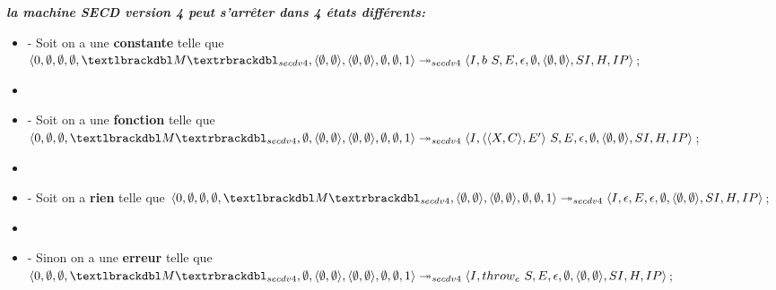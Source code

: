 \documentclass[10pt,a4paper]{report}
\begin{document}
	
	\textbf{\textit{la machine SECD version 4 peut s'arrêter dans 4 états différents:}}
	\smallbreak
	\begin{itemize}
		\item[] - Soit on a une \textbf{constante} telle que $\langle 0,\emptyset,\emptyset,\emptyset,\textlbrackdbl M\textrbrackdbl_{secdv4},\langle\emptyset,\emptyset\rangle,\langle\emptyset,\emptyset\rangle,\emptyset,\emptyset,1\rangle \\
		\twoheadrightarrow_{secdv4} \langle I,b~S,E,\epsilon,\emptyset,\langle\emptyset,\emptyset\rangle,SI,H,IP\rangle$;
		\item[] 
		\item[] - Soit on a une \textbf{fonction} telle que
		$\langle 0,\emptyset,\emptyset,\textlbrackdbl M\textrbrackdbl_{secdv4},\emptyset,\langle\emptyset,\emptyset\rangle,\langle\emptyset,\emptyset\rangle,\emptyset,\emptyset,1\rangle \\
		\twoheadrightarrow_{secdv4} \langle I,\langle\langle X,C\rangle,E'\rangle~S,E,\epsilon,\emptyset,\langle\emptyset,\emptyset\rangle,SI,H,IP\rangle$;
		\item[] 
		\item[] - Soit on a \textbf{rien} telle que $\langle 0,\emptyset,\emptyset,\emptyset,\textlbrackdbl M\textrbrackdbl_{secdv4},\langle\emptyset,\emptyset\rangle,\langle\emptyset,\emptyset\rangle,\emptyset,\emptyset,1\rangle \\
		\twoheadrightarrow_{secdv4} \langle I,\epsilon,E,\epsilon,\emptyset,\langle\emptyset,\emptyset\rangle,SI,H,IP\rangle$;
		\item[] 
		\item[] - Sinon on a une \textbf{erreur} telle que 
		$\langle 0,\emptyset,\emptyset,\textlbrackdbl M\textrbrackdbl_{secdv4},\emptyset,\langle\emptyset,\emptyset\rangle,\langle\emptyset,\emptyset\rangle,\emptyset,\emptyset,1\rangle \\
		\twoheadrightarrow_{secdv4} \langle I,throw_{e}~S,E,\epsilon,\emptyset,\langle\emptyset,\emptyset\rangle,SI,H,IP\rangle$;
	\end{itemize}
	
\end{document}
